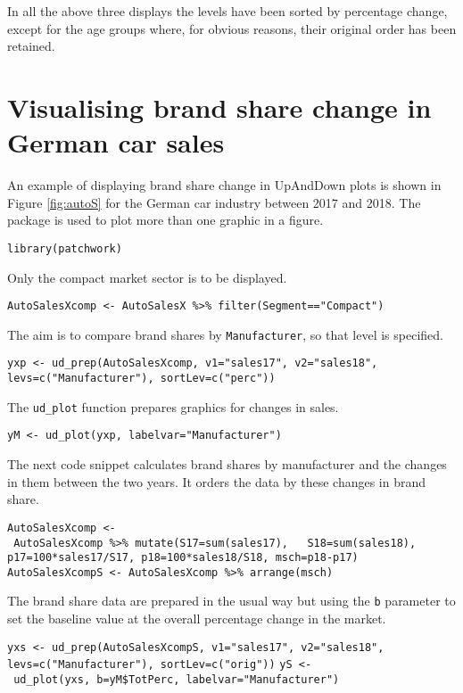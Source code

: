 In all the above three displays the levels have been sorted by percentage change, except for the age groups where, for obvious reasons, their original order has been retained.

\hypertarget{visualising-brand-share-change-in-german-car-sales}{%
\section{Visualising brand share change in German car sales}\label{visualising-brand-share-change-in-german-car-sales}}

An example of displaying brand share change in UpAndDown plots is shown in Figure \ref{fig:autoS} for the German car industry between 2017 and 2018. The  package \citep{pedersen:2024} is used to plot more than one graphic in a figure.

\texttt{library(patchwork)}

Only the compact market sector is to be displayed.

\texttt{AutoSalesXcomp\ \textless{}-\ AutoSalesX\ \%\textgreater{}\%\ filter(Segment=="Compact")}

The aim is to compare brand shares by \texttt{Manufacturer}, so that level is specified.

\texttt{yxp\ \textless{}-\ ud\_prep(AutoSalesXcomp,\ v1="sales17",\ v2="sales18",}
\texttt{levs=c("Manufacturer"),\ sortLev=c("perc"))}

The \texttt{ud\_plot} function prepares graphics for changes in sales.

\texttt{yM\ \textless{}-\ ud\_plot(yxp,\ labelvar="Manufacturer")}

The next code snippet calculates brand shares by manufacturer and the changes in them between the two years. It orders the data by these changes in brand share.

\texttt{AutoSalesXcomp\ \textless{}-\ AutoSalesXcomp\ \%\textgreater{}\%\ mutate(S17=sum(sales17),\ \ \ S18=sum(sales18),} \texttt{p17=100*sales17/S17,\ p18=100*sales18/S18,\ msch=p18-p17)}
\texttt{AutoSalesXcompS\ \textless{}-\ AutoSalesXcomp\ \%\textgreater{}\%\ arrange(msch)}

The brand share data are prepared in the usual way but using the \texttt{b} parameter to set the baseline value at the overall percentage change in the market.

\texttt{yxs\ \textless{}-\ ud\_prep(AutoSalesXcompS,\ v1="sales17",\ v2="sales18",}
\texttt{levs=c("Manufacturer"),\ sortLev=c("orig"))}
\texttt{yS\ \textless{}-\ ud\_plot(yxs,\ b=yM\$TotPerc,\ labelvar="Manufacturer")}

